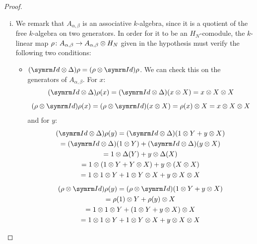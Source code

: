 \begin{proof}
~
\begin{enumerate}[(i)]
    \item We remark that \(A_{\alpha, \beta}\) is an associative \(k\)-algebra, since it is a quotient of the free \(k\)-algebra on two generators. In order for it to be an \(H_N\)-comodule, the \(k\)-linear map \(\rho \colon A_{\alpha, \beta} \to A_{\alpha, \beta} \otimes H_N\) given in the hypothesis must verify the following two conditions:
    \begin{itemize}
        \item \((\Id \tensor \Delta) \rho = (\rho \tensor \Id) \rho\). We can check this on the generators of \(A_{\alpha, \beta}\). For \(x\):
        \begin{gather*}
            (\Id \tensor \Delta) \rho (x) = (\Id \tensor \Delta) (x \tensor X) = x \tensor X \tensor X \\[0.5em]
            (\rho \tensor \Id) \rho (x) = (\rho \tensor \Id) (x \tensor X) = \rho(x) \tensor X = x \tensor X \tensor X
        \end{gather*}
        and for \(y\):
        \begin{gather*}
            (\Id \tensor \Delta) \rho (y) = (\Id \tensor \Delta) (1 \tensor Y + y \tensor X) \\
            = (\Id \tensor \Delta) (1 \tensor Y) + (\Id \tensor \Delta) (y \tensor X) \\
            = 1 \tensor \Delta(Y) + y \tensor \Delta(X) \\
            = 1 \tensor (1 \tensor Y + Y \tensor X) + y \tensor (X \tensor X) \\
            = 1 \tensor 1 \tensor Y + 1 \tensor Y \tensor X + y \tensor X \tensor X \\[0.5em]
            (\rho \tensor \Id) \rho (y) = (\rho \tensor \Id) (1 \tensor Y + y \tensor X) \\
            = \rho(1) \tensor Y + \rho(y) \tensor X \\
            = 1 \tensor 1 \tensor Y + (1 \tensor Y + y \tensor X) \tensor X \\
            = 1 \tensor 1 \tensor Y + 1 \tensor Y \tensor X + y \tensor X \tensor X
        \end{gather*}
        

\end{itemize}
\end{enumerate}
\end{proof}
